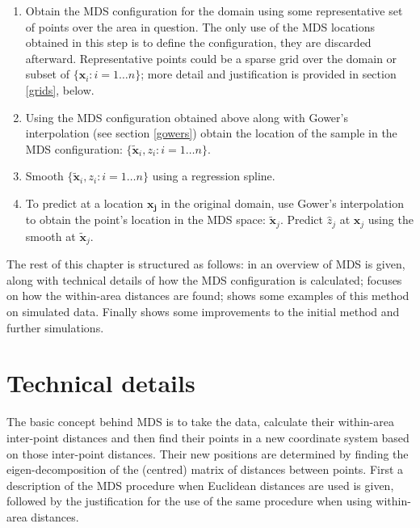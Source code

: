 \begin{enumerate}
\item Obtain the MDS configuration for the domain using some representative set of points over the area in question. The only use of the MDS locations obtained in this step is to define the configuration, they are discarded afterward. Representative points could be a sparse grid over the domain or subset of $\{\mathbf{x}_i : i=1\dots n\}$; more detail and justification is provided in section \ref{grids}, below.

\item Using the MDS configuration obtained above along with Gower's interpolation (see section \ref{gowers}) obtain the location of the sample in the MDS configuration: $\{\mathbf{\tilde{x}}_i, z_i : i=1\dots n\}$.

\item Smooth $\{\mathbf{\tilde{x}}_i, z_i : i=1\dots n\}$ using a regression spline.

\item To predict at a location $\mathbf{x_j}$ in the original domain, use Gower's interpolation to 
obtain the point's location in the MDS space: $\mathbf{\tilde{x}}_j$. Predict $\hat{z}_j$ at $\mathbf{x}_j$ using the smooth at $\mathbf{\tilde{x}}_j$.
\end{enumerate}

The rest of this chapter is structured as follows: in  an overview of MDS is given, along with technical details of how the MDS configuration is calculated;  focuses on how the within-area distances are found;  shows some examples of this method on simulated data. Finally  shows some improvements to the initial method and further simulations.


\section{Technical details}
\label{MDStechdet}

The basic concept behind MDS is to take the data, calculate their within-area inter-point distances and then find their points in a new coordinate system based on those inter-point distances. Their new positions are determined by finding the eigen-decomposition of the (centred) matrix of distances between points. First a description of the MDS procedure when Euclidean distances are used is given, followed by the justification for the use of the same procedure when using within-area distances. 

